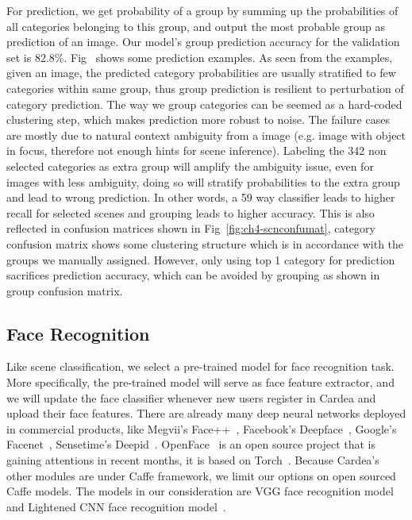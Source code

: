 For prediction, we get probability of a group by summing up the probabilities of all categories belonging to this group, and output the most probable group as prediction of an image. Our model's group prediction accuracy for the validation set is 82.8\%. Fig~\cite{} shows some prediction examples. As seen from the examples, given an image, the predicted category probabilities are usually stratified to few categories within same group, thus group prediction is resilient to perturbation of category prediction. The way we group categories can be seemed as a hard-coded clustering step, which makes prediction more robust to noise. The failure cases are mostly due to natural context ambiguity from a image (e.g. image with object in focus, therefore not enough hints for scene inference). Labeling the 342 non selected categories as extra group will amplify the ambiguity issue, even for images with less ambiguity, doing so will stratify probabilities to the extra group and lead to wrong prediction. In other words, a 59 way classifier leads to higher recall for selected scenes and grouping leads to higher accuracy. This is also reflected in confusion matrices shown in Fig~\ref{fig:ch4-scnconfumat}, category confusion matrix shows some clustering structure which is in accordance with the groups we manually assigned. However, only using top 1 category for prediction sacrifices prediction accuracy, which can be avoided by grouping as shown in group confusion matrix.


\subsection{Face Recognition}
Like scene classification, we select a pre-trained model for face recognition task. More specifically, the pre-trained model will serve as face feature extractor, and we will update the face classifier whenever new users register in Cardea and upload their face features. There are already many deep neural networks deployed in commercial products, like Megvii's Face++~\cite{zhou2013extensive}, Facebook's Deepface~\cite{taigman2014deepface}, Google's Facenet~\cite{schroff2015facenet}, Sensetime's Deepid~\cite{sun2015deepid3}. OpenFace~\cite{amos2016openface} is an open source project that is gaining attentions in recent months, it is based on Torch~\cite{links:torch7}. Because Cardea's other modules are under Caffe framework, we limit our options on open sourced Caffe models. The models in our consideration are VGG face recognition model~\cite{parkhi2015deep} and Lightened CNN face recognition model~\cite{wu2015lightened}.

